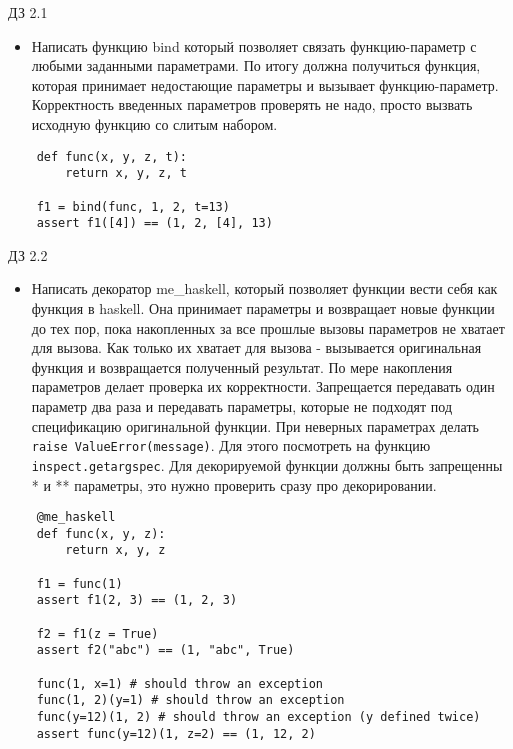 \documentclass{article}
\begin{document}
\begin{center} ДЗ 2.1 \end{center}
\begin{itemize}
    \item Написать функцию bind который позволяет связать функцию-параметр с любыми заданными
        параметрами. По итогу должна получиться функция, которая принимает недостающие параметры
        и вызывает функцию-параметр. Корректность введенных параметров проверять не надо, просто
        вызвать исходную функцию со слитым набором.
\end{itemize}
\vspace{15pt}
\begin{lstlisting}
    def func(x, y, z, t):
        return x, y, z, t

    f1 = bind(func, 1, 2, t=13)
    assert f1([4]) == (1, 2, [4], 13)
\end{lstlisting}
\newpage

\begin{center} ДЗ 2.2 \end{center}
\begin{itemize}
    \item Написать декоратор me\_haskell, который позволяет функции вести себя как функция в haskell.
        Она принимает параметры и возвращает новые функции до тех пор, пока накопленных
        за все прошлые вызовы параметров не хватает для вызова. Как только их хватает для
        вызова - вызывается оригинальная функция и возвращается полученный результат.
        По мере накопления параметров делает проверка их корректности.
        Запрещается передавать один параметр два раза и передавать параметры, которые не
        подходят под спецификацию оригинальной функции. При неверных параметрах
        делать \lstinline!raise ValueError(message)!.
        Для этого посмотреть на функцию \lstinline!inspect.getargspec!.
        Для декорируемой функции должны быть запрещенны * и ** параметры, это
        нужно проверить сразу про декорировании.
\end{itemize}
\vspace{15pt}
\begin{lstlisting}
    @me_haskell
    def func(x, y, z):
        return x, y, z

    f1 = func(1)
    assert f1(2, 3) == (1, 2, 3)

    f2 = f1(z = True)
    assert f2("abc") == (1, "abc", True)

    func(1, x=1) # should throw an exception
    func(1, 2)(y=1) # should throw an exception
    func(y=12)(1, 2) # should throw an exception (y defined twice)
    assert func(y=12)(1, z=2) == (1, 12, 2)
\end{lstlisting}
\newpage
\end{document}
